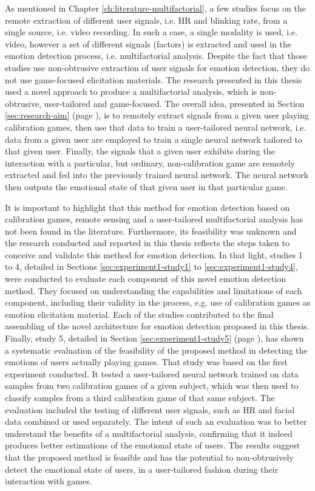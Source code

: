 As mentioned in Chapter \ref{ch:literature-multifactorial}, a few studies focus on the remote extraction of different user signals, i.e. HR and blinking rate, from a single source, i.e. video recording. In such a case, a single modality is used, i.e. video, however a set of different signals (factors) is extracted and used in the emotion detection process, i.e. multifactorial analysis. Despite the fact that those studies use non-obtrusive extraction of user signals for emotion detection, they do not use game-focused elicitation materials. The research presented in this thesis used a novel approach to produce a multifactorial analysis, which is non-obtrusive, user-tailored and game-focused. The overall idea, presented in Section \ref{sec:research-aim} (page \pageref{sec:research-aim}), is to remotely extract signals from a given user playing calibration games, then use that data to train a user-tailored neural network, i.e. data from a given user are employed to train a single neural network tailored to that given user. Finally, the signals that a given user exhibits during the interaction with a particular, but ordinary, non-calibration game are remotely extracted and fed into the previously trained neural network. The neural network then outputs the emotional state of that given user in that particular game.

It is important to highlight that this method for emotion detection based on calibration games, remote sensing and a user-tailored multifactorial analysis has not been found in the literature. Furthermore, its feasibility was unknown and the research conducted and reported in this thesis reflects the steps taken to conceive and validate this method for emotion detection. In that light, studies 1 to 4, detailed in Sections \ref{sec:experiment1-study1} to \ref{sec:experiment1-study4}, were conducted to evaluate each component of this novel emotion detection method. They focused on understanding the capabilities and limitations of each component, including their validity in the process, e.g. use of calibration games as emotion elicitation material. Each of the studies contributed to the final assembling of the novel architecture for emotion detection proposed in this thesis. Finally, study 5, detailed in Section \ref{sec:experiment1-study5} (page \pageref{sec:experiment1-study5}), has shown a systematic evaluation of the feasibility of the proposed method in detecting the emotions of users actually playing games. That study was based on the first experiment conducted. It tested a user-tailored neural network trained on data samples from two calibration games of a given subject, which was then used to classify samples from a third calibration game of that same subject. The evaluation included the testing of different user signals, such as HR and facial data combined or used separately. The intent of such an evaluation was to better understand the benefits of a multifactorial analysis, confirming that it indeed produces better estimations of the emotional state of users. The results suggest that the proposed method is feasible and has the potential to non-obtrusively detect the emotional state of users, in a user-tailored fashion during their interaction with games.

